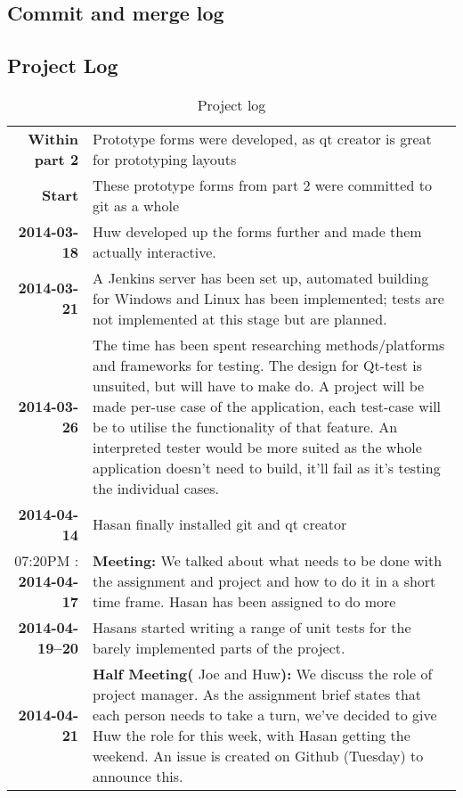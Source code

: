 \documentclass{unitemplate}
\begin{document}
\subsection{Commit and merge log}



\subsection{Project Log}

\renewcommand{\arraystretch}{1.5} %
\begin{table}[h]
\begin{tabularx}{\textwidth}{r|X}
    \textbf{Within part 2} & Prototype forms were developed, as qt creator is great for prototyping layouts \\
    \textbf{Start} & These prototype forms from part 2 were committed to git as a whole \\
    \textbf{2014-03-18} & Huw developed up the forms further and made them actually interactive. \\
    \textbf{2014-03-21} & A Jenkins server has been set up, automated building for Windows and Linux has been implemented; tests are not implemented at this stage but are planned.\\
    \textbf{2014-03-26} & The time has been spent researching methods/platforms and frameworks for testing. The design for Qt-test is unsuited, but will have to make do. A project will be made per-use case of the application, each test-case will be to utilise the functionality of that feature. An interpreted tester would be more suited as the whole application doesn't need to build, it'll fail as it's testing the individual cases. \\
    \textbf{2014-04-14} & Hasan finally installed git and qt creator \\
    07:20PM : \textbf{2014-04-17} &  \textbf{Meeting:} We talked about what needs to be done with the assignment and project and how to do it in a short time frame. Hasan has been assigned to do more \\
    \textbf{2014-04-19--20} & Hasans started writing a range of unit tests for the barely implemented parts of the project. \\
    \textbf{2014-04-21} & \textbf{Half Meeting(} Joe and Huw\textbf{):} We discuss the role of project manager. As the assignment brief states that each person needs to take a turn, we've decided to give Huw the role for this week, with Hasan getting the weekend. An issue is created on Github (Tuesday) to announce this.
    
\end{tabularx}
    \caption{Project log}
    \label{tab:roles}
\end{table}
\clearpage
\end{document}
